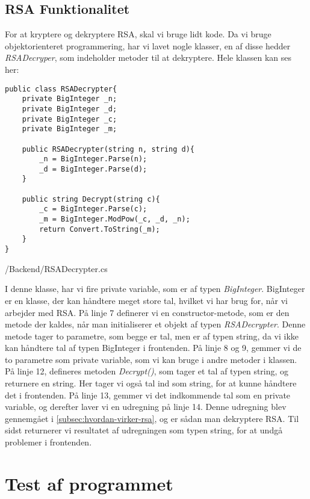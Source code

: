 \documentclass[a4paper,12pt]{extarticle}
\begin{document}
    \subsection{RSA Funktionalitet}\label{subsec:rsa-functionality}
    For at kryptere og dekryptere RSA, skal vi bruge lidt kode.
    Da vi bruge objektorienteret programmering, har vi lavet nogle klasser, en af disse hedder \emph{RSADecryper},
    som indeholder metoder til at dekryptere.
    Hele klassen kan ses her:
    \begin{listing}[!ht]
        \begin{verbatim}
public class RSADecrypter{
    private BigInteger _n;
    private BigInteger _d;
    private BigInteger _c;
    private BigInteger _m;
    
    public RSADecrypter(string n, string d){
        _n = BigInteger.Parse(n);
        _d = BigInteger.Parse(d);
    }
    
    public string Decrypt(string c){
        _c = BigInteger.Parse(c);
        _m = BigInteger.ModPow(_c, _d, _n);
        return Convert.ToString(_m);
    }
}
        \end{verbatim}
        \caption{/Backend/RSADecrypter.cs}
    \end{listing}

    I denne klasse, har vi fire private variable, som er af typen \emph{BigInteger}.
    BigInteger er en klasse, der kan håndtere meget store tal, hvilket vi har brug for, når vi arbejder med RSA.\@
    På linje 7 definerer vi en constructor-metode, som er den metode der kaldes,
    når man initialiserer et objekt af typen \emph{RSADecrypter}.
    Denne metode tager to parametre, som begge er tal, men er af typen string,
    da vi ikke kan håndtere tal af typen BigInteger i frontenden.
    På linje 8 og 9, gemmer vi de to parametre som private variable, som vi kan bruge i andre metoder i klassen.\@
    På linje 12, defineres metoden \emph{Decrypt()}, som tager et tal af typen string, og returnere en string.
    Her tager vi også tal ind som string, for at kunne håndtere det i frontenden.
    På linje 13, gemmer vi det indkommende tal som en private variable, og derefter laver vi en udregning på linje 14.
    Denne udregning blev gennemgået i \autoref{subsec:hvordan-virker-rsa}, og er sådan man dekryptere RSA.\@
    Til sidst returnerer vi resultatet af udregningen som typen string, for at undgå problemer i frontenden.\@

    \section{Test af programmet}\label{sec:testing}
\end{document}
